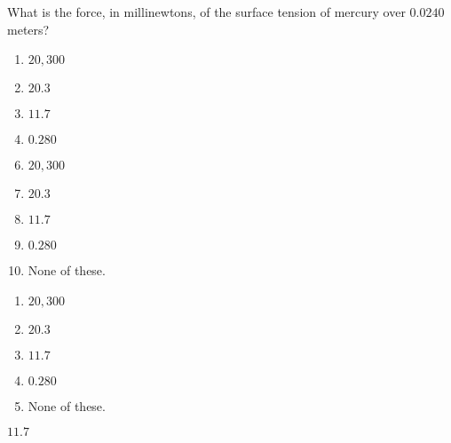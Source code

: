  
What is the force, in millinewtons, of the surface tension of mercury over $0.0240$ meters?


\ifsat
	\begin{enumerate}[label=\Alph*)]
		\item $20,300 $ 
		\item $20.3 $ 
		\item $11.7 $ %
		\item $0.280 $
	\end{enumerate}
\else
\fi

\ifacteven
	\begin{enumerate}[label=\textbf{\Alph*.},itemsep=\fill,align=left]
		\setcounter{enumii}{5}
		\item $20,300 $ 
		\item $20.3 $ 
		\item $11.7 $ %
		\addtocounter{enumii}{1}
		\item $0.280 $
		\item None of these. 
	\end{enumerate}
\else
\fi

\ifactodd
	\begin{enumerate}[label=\textbf{\Alph*.},itemsep=\fill,align=left]
		\item $20,300 $ 
		\item $20.3 $ 
		\item $11.7 $ %
		\item $0.280 $
		\item None of these. 
	\end{enumerate}
\else
\fi

\ifgridin
 $11.7 $ %
		
\else
\fi

